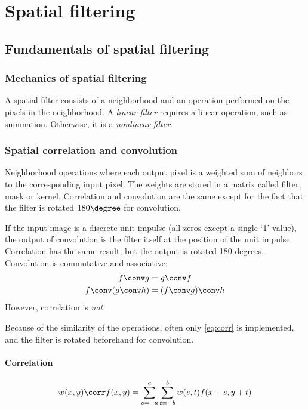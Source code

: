 \section{Spatial filtering}

\subsection{Fundamentals of spatial filtering}

\subsubsection{Mechanics of spatial filtering}
A spatial filter consists of a neighborhood and an operation performed on the pixels in the neighborhood. A \emph{linear filter} requires a linear operation, such as summation. Otherwise, it is a \emph{nonlinear filter}.

\subsubsection{Spatial correlation and convolution}
Neighborhood operations where each output pixel is a weighted sum of neighbors to the corresponding input pixel. The weights are stored in a matrix called filter, mask or kernel. Correlation and convolution are the same except for the fact that the filter is rotated $180 \degree$ for convolution.

If the input image is a discrete unit impulse (all zeros except a single `1' value), the output of convolution is the filter itself at the position of the unit impulse. Correlation has the same result, but the output is rotated 180 degrees. Convolution is commutative and associative:
\begin{gather}
    f \conv g = g \conv f \\
    f \conv (g \conv h) = (f \conv g) \conv h
\end{gather}
However, correlation is \emph{not}.

Because of the similarity of the operations, often only \eqref{eq:corr} is implemented, and the filter is rotated beforehand for convolution.

\paragraph{Correlation}
\begin{equation}\label{eq:corr}
    w(x,y) \corr f(x,y)
    =
    \sum_{s=-a}^{a}
    \sum_{t=-b}^{b}
    w(s,t) f(x+s, y+t)
\end{equation}

